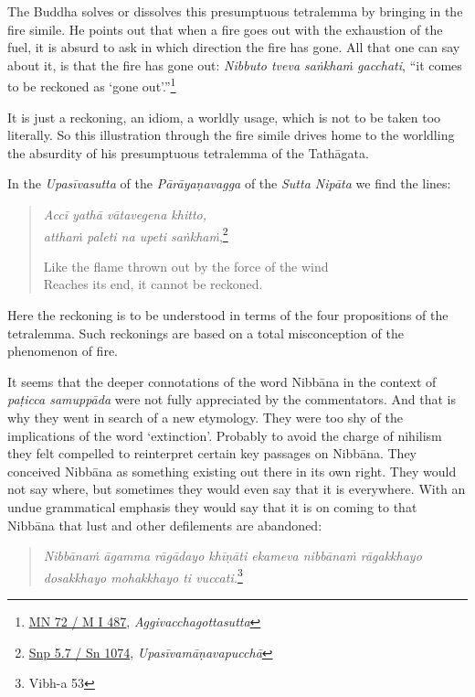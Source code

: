 The Buddha solves or dissolves this presumptuous tetralemma by bringing in the fire simile. He points out that when a fire goes out with the exhaustion of the fuel, it is absurd to ask in which direction the fire has gone. All that one can say about it, is that the fire has gone out: \emph{Nibbuto tveva saṅkhaṁ gacchati}, ``it comes to be reckoned as `gone out'.''\footnote{\href{https://suttacentral.net/mn72/pli/ms}{MN 72 / M I 487}, \emph{Aggivacchagottasutta}}

It is just a reckoning, an idiom, a worldly usage, which is not to be taken too literally. So this illustration through the fire simile drives home to the worldling the absurdity of his presumptuous tetralemma of the Tathāgata.

In the \emph{Upasīvasutta} of the \emph{Pārāyaṇavagga} of the \emph{Sutta Nipāta} we find the lines:

\begin{quote}
\emph{Accī yathā vātavegena khitto,}\\
\emph{atthaṁ paleti na upeti saṅkhaṁ},\footnote{\href{https://suttacentral.net/snp5.7/pli/ms}{Snp 5.7 / Sn 1074}, \emph{Upasīvamāṇavapucchā}}

Like the flame thrown out by the force of the wind\\
Reaches its end, it cannot be reckoned.
\end{quote}

Here the reckoning is to be understood in terms of the four propositions of the tetralemma. Such reckonings are based on a total misconception of the phenomenon of fire.

It seems that the deeper connotations of the word Nibbāna in the context of \emph{paṭicca samuppāda} were not fully appreciated by the commentators. And that is why they went in search of a new etymology. They were too shy of the implications of the word `extinction'. Probably to avoid the charge of nihilism they felt compelled to reinterpret certain key passages on Nibbāna. They conceived Nibbāna as something existing out there in its own right. They would not say where, but sometimes they would even say that it is everywhere. With an undue grammatical emphasis they would say that it is on coming to that Nibbāna that lust and other defilements are abandoned:

\begin{quote}
\emph{Nibbānaṁ āgamma rāgādayo khīṇāti ekameva nibbānaṁ rāgakkhayo dosakkhayo mohakkhayo ti vuccati.}\footnote{Vibh-a 53}
\end{quote}

